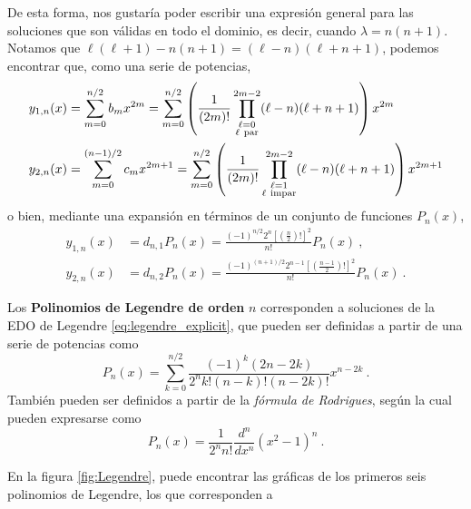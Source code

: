 De esta forma, nos gustaría poder escribir una expresión general para las soluciones que son válidas en todo el dominio, es decir, cuando $\lambda = n(n+1)$. Notamos que $\ell(\ell+1)-n(n+1) = (\ell - n)(\ell + n + 1)$, podemos encontrar que, como una serie de potencias,
\begin{align} 
    y_{1,n}(x) & = \sum_{m=0}^{n/2} b_m x^{2m} = \sum_{m=0}^{n/2} \left(\frac{1}{(2m)!} \prod_{\substack{\ell=0 \\ \ell \mbox{ \scriptsize{par}}}}^{2m-2} (\ell-n)(\ell+n+1) \right) x^{2m} \\
    y_{2,n}(x) & = \sum_{m=0}^{(n-1)/2} c_m x^{2m+1} = \sum_{m=0}^{n/2} \left(\frac{1}{(2m)!} \prod_{\substack{\ell=1 \\ \ell \mbox{ \scriptsize{impar}}}}^{2m-2} (\ell-n)(\ell+n+1) \right) x^{2m+1}
\end{align}
o bien, mediante una expansión en términos de un conjunto de funciones $P_n(x)$,
\begin{align}
   y_{1,n}(x) & = d_{n,1} P_n(x) = \frac{(-1)^{n/2} 2^n \left[ \left(\frac{n}{2}\right)! \right]^2}{n!}P_n(x) \ , \label{eq:y1n_legendre}  \\
   y_{2,n}(x) & = d_{n,2} P_n(x) = \frac{(-1)^{(n+1)/2} 2^{n-1} \left[ \left(\frac{n-1}{2}\right)! \right]^2}{n!}P_n(x) \ . \label{eq:y2n_legendre}
\end{align}


\begin{defi}
    Los \textbf{Polinomios de Legendre de orden} $n$ corresponden a soluciones de la EDO de Legendre \eqref{eq:legendre_explicit}, que pueden ser definidas a partir de una serie de potencias como
    \begin{equation}
        P_n(x) = \sum_{k=0}^{n/2} \frac{(-1)^k (2n-2k)}{2^n k! (n-k)! (n-2k)!}x^{n-2k} \ .
    \end{equation}
    También pueden ser definidos a partir de la \emph{fórmula de Rodrigues}, según la cual pueden expresarse como
    \begin{equation}
        P_n(x) = \frac{1}{2^n n!} \frac{d^n}{dx^n} (x^2-1)^n \ .
    \end{equation}
\end{defi}


En la figura \ref{fig:Legendre}, puede encontrar las gráficas de los primeros seis polinomios de Legendre, los que corresponden a

